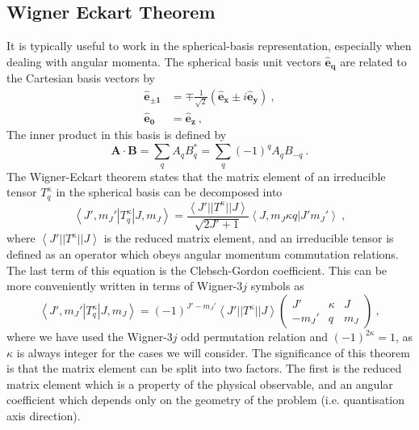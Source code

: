 \documentclass{article}
\begin{document}
\subsection{Wigner Eckart Theorem}
It is typically useful to work in the spherical-basis representation, especially when dealing with angular momenta. The spherical basis unit vectors $\boldsymbol{\hat{e}_{q}}$ are related to the Cartesian basis vectors by 
\begin{align}
    \boldsymbol{\hat{e}_{\pm{1}}} &= \mp \frac{1}{\sqrt{2}} \left(\boldsymbol{\hat{e}_x} \pm i\boldsymbol{\hat{e}_y}\right)~, \\
    \boldsymbol{\hat{e}_{0}} &= \boldsymbol{\hat{e}_z}~,
\end{align}
The inner product in this basis is defined by 
\begin{equation}
    \mathbf{A}\cdot\mathbf{B} = \sum_q A_qB^*_q =  \sum_q (-1)^qA_qB_{-q}~.
\end{equation}
The Wigner-Eckart theorem states that the matrix element of an irreducible tensor $T^{\kappa}_q$ in the spherical basis can be decomposed into 
\begin{equation}
    \left\langle J', m_J'|T^{\kappa}_q|J, m_J\right\rangle=\frac{\left\langle J'||T^{\kappa}||J\right\rangle}{\sqrt{2J'+1}}\left\langle J, m_J\kappa q|J'm_J'\right\rangle~,
\end{equation}
where $\left\langle J'||T^{\kappa}||J\right\rangle$ is the reduced matrix element, and an irreducible tensor is defined as an operator which obeys angular momentum commutation relations. The last term of this equation is the Clebsch-Gordon coefficient. This can be more conveniently written in terms of Wigner-$3j$ symbols as
\begin{equation}
\left\langle J', m_J'|T^{\kappa}_q|J, m_J\right\rangle= (-1)^{J'-m_J'}\left\langle J'||T^{\kappa}||J\right\rangle
\begin{pmatrix}
J' & \kappa & J\\
-m_J' & q & m_J
\end{pmatrix}~,
\end{equation}
where we have used the Wigner-3$j$ odd permutation relation and $(-1)^{2\kappa} = 1$, as $\kappa$ is always integer for the cases we will consider.
The significance of this theorem is that the matrix element can be split into two factors. The first is the reduced matrix element which is a property of the physical observable, and an angular coefficient which depends only on the geometry of the problem (i.e. quantisation axis direction).
\end{document}
